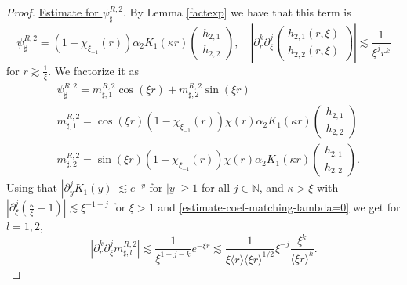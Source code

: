 \documentclass[11 pt]{amsart}
\theoremstyle{definition}
\theoremstyle{remark}
\numberwithin{equation}{section}
\begin{document}
\begin{proof}
     
\noindent \underline{Estimate for $\psi_\sharp^{R,2}$}. By Lemma \ref{factexp} we have that this term is
$$
\psi_\sharp^{R,2} = (1-\chi_{\xi_{-1}}(r)) \alpha_2 K_1\left(\kappa r\right) \begin{pmatrix} h_{2,1} \\ h_{2,2}\end{pmatrix}, \quad \left|\partial_r^k \partial_\xi^j \begin{pmatrix} h_{2,1}(r,\xi) \\ h_{2,2}(r,\xi)\end{pmatrix}\right|\lesssim \frac{1}{\xi^j r^k}
$$
for $r\gtrsim \frac{1}{\xi}$. We factorize it as
\begin{align*}
& \psi_\sharp^{R,2} = m^{R,2}_{\sharp,1}\cos(\xi r)+m^{R,2}_{\sharp,2}\sin(\xi r) \\
& m^{R,2}_{\sharp,1}=\cos(\xi r)(1-\chi_{\xi_{-1}}(r))\chi(r) \alpha_2 K_1\left(\kappa r\right) \begin{pmatrix} h_{2,1} \\ h_{2,2}\end{pmatrix} \\
& m^{R,2}_{\sharp,2}=\sin(\xi r)(1-\chi_{\xi_{-1}}(r))\chi(r) \alpha_2 K_1\left(\kappa r\right) \begin{pmatrix} h_{2,1} \\ h_{2,2}\end{pmatrix}.
\end{align*}
Using that $|\partial_y^j K_1(y)|\lesssim e^{-y}$ for $|y|\geq 1$ for all $j\in \mathbb N$, and $\kappa>\xi$ with $|\partial_\xi^j(\frac{\kappa}{\xi}-1)|\lesssim \xi^{-1-j}$ for $\xi>1$ and \eqref{estimate-coef-matching-lambda=0} we get for $l=1,2$,
\begin{equation} \label{bd:msharp-inter-2}
|\partial_r^k \partial_\xi^j m^{R,2}_{\sharp,l}|\lesssim \frac{1}{\xi^{1+j-k}}e^{-\xi r} \lesssim \frac{1}{\xi \langle r \rangle \langle \xi r \rangle^{1/2}} \xi^{- j} \frac{\xi^k}{\langle \xi r \rangle^k}.
\end{equation}


\end{proof}
\end{document}
